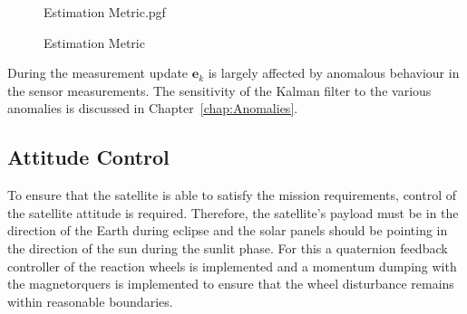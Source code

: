 \begin{figure}[!htb]
	\centering
	\def\pgfwidth{10cm}
	{Estimation Metric.pgf}
	
	\caption{Estimation Metric}
	\label{fig:Estimation Metric}
\end{figure}

During the measurement update $\mathbf{e}_k$ is largely affected by anomalous behaviour in the sensor measurements. The sensitivity of the Kalman filter to the various anomalies is discussed in Chapter~\ref{chap:Anomalies}.

\subsection{Attitude Control}
To ensure that the satellite is able to satisfy the mission requirements, control of the satellite attitude is required. Therefore, the satellite's payload must be in the direction of the Earth during eclipse and the solar panels should be pointing in the direction of the sun during the sunlit phase. For this a quaternion feedback controller of the reaction wheels is implemented and a momentum dumping with the magnetorquers is implemented to ensure that the wheel disturbance remains within reasonable boundaries.

